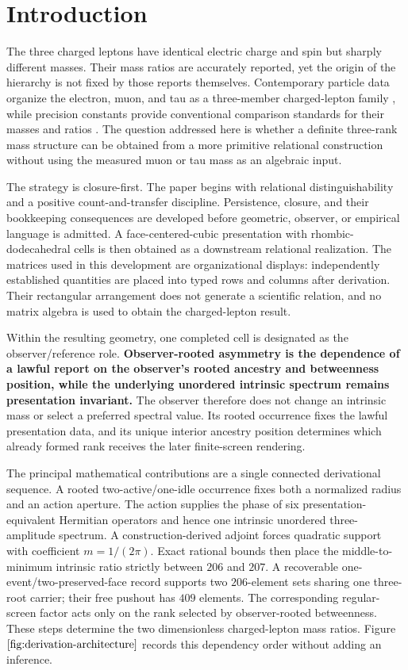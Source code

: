 \section*{Introduction}
The three charged leptons have identical electric charge and spin but sharply different masses. Their mass ratios are accurately reported, yet the origin of the hierarchy is not fixed by those reports themselves. Contemporary particle data organize the electron, muon, and tau as a three-member charged-lepton family \cite{PDG2024}, while precision constants provide conventional comparison standards for their masses and ratios \cite{CODATA2022}. The question addressed here is whether a definite three-rank mass structure can be obtained from a more primitive relational construction without using the measured muon or tau mass as an algebraic input.

The strategy is closure-first. The paper begins with relational distinguishability and a positive count-and-transfer discipline. Persistence, closure, and their bookkeeping consequences are developed before geometric, observer, or empirical language is admitted. A face-centered-cubic presentation with rhombic-dodecahedral cells is then obtained as a downstream relational realization. The matrices used in this development are organizational displays: independently established quantities are placed into typed rows and columns after derivation. Their rectangular arrangement does not generate a scientific relation, and no matrix algebra is used to obtain the charged-lepton result.

Within the resulting geometry, one completed cell is designated as the observer/reference role. \textbf{Observer-rooted asymmetry is the dependence of a lawful report on the observer's rooted ancestry and betweenness position, while the underlying unordered intrinsic spectrum remains presentation invariant.} The observer therefore does not change an intrinsic mass or select a preferred spectral value. Its rooted occurrence fixes the lawful presentation data, and its unique interior ancestry position determines which already formed rank receives the later finite-screen rendering.

The principal mathematical contributions are a single connected derivational sequence. A rooted two-active/one-idle occurrence fixes both a normalized radius and an action aperture. The action supplies the phase of six presentation-equivalent Hermitian operators and hence one intrinsic unordered three-amplitude spectrum. A construction-derived adjoint forces quadratic support with coefficient \(m=1/(2\pi)\). Exact rational bounds then place the middle-to-minimum intrinsic ratio strictly between \(206\) and \(207\). A recoverable one-event/two-preserved-face record supports two \(206\)-element sets sharing one three-root carrier; their free pushout has \(409\) elements. The corresponding regular-screen factor acts only on the rank selected by observer-rooted betweenness. These steps determine the two dimensionless charged-lepton mass ratios. Figure \(\ref{fig:derivation-architecture}\) records this dependency order without adding an inference.

